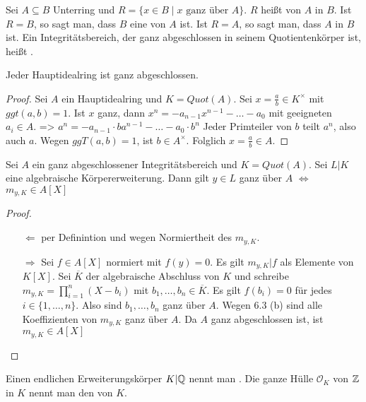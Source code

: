 \documentclass[../main.tex]{subfiles}
\begin{document}
\begin{definition}
    Sei $A\subseteq B$ Unterring und $R=\{x\in B\mid \text{$x$ ganz über $A$}\}$.
    $R$ heißt  von $A$ in $B$.
    Ist $R=B$, so sagt man, dass $B$ eine  von $A$ ist.
    Ist $R=A$, so sagt man, dass $A$  in $B$ ist.
    Ein Integritätsbereich, der ganz abgeschlossen in seinem Quotientenkörper ist, heißt .
\end{definition}
\begin{lemma}
    Jeder Hauptidealring ist ganz abgeschlossen.
\end{lemma}
\begin{proof}
    Sei $A$ ein Hauptidealring und $K=Quot(A)$.
    Sei $x=\frac{a}{b}\in K^\times$ mit $ggt(a,b) = 1$. Ist $x$ ganz, dann $x^n = -a_{n-1}x^{n-1}-\dots -a_0$ mit geeigneten $a_i\in A$.
    => $a^n = -a_{n-1} \cdot ba^{n-1}-\dots - a_0 \cdot b^n$
    Jeder Primteiler von $b$ teilt $a^n$, also auch $a$. Wegen $ggT(a,b)=1$, ist $b\in A^\times$. Folglich $x=\frac{a}{b}\in A$.
\end{proof}
\begin{theorem}
    Sei $A$ ein ganz abgeschlossener Integritätsbereich und $K=Quot(A)$. Sei $L|K$ eine algebraische Körpererweiterung.
    Dann gilt $y\in L$ ganz über $A$ $\Leftrightarrow$ $m_{y,K}\in A[X]$
\end{theorem}
\begin{proof}$ $
    \begin{itemize}
        \item[$\Leftarrow$] per Definintion und wegen Normiertheit des $m_{y,K}$.
        \item[$\Rightarrow$] Sei $f\in A[X]$ normiert mit $f(y) = 0$.
        Es gilt $m_{y,K}|f$ als Elemente von $K[X]$.
        Sei $\overline{K}$ der algebraische Abschluss von $K$ und schreibe $m_{y,K}=\prod_{i=1}^n (X-b_i)$ mit $b_1,\dots,b_n\in \overline{K}$.
        Es gilt $f(b_i)=0$ für jedes $i\in\{1,\dots,n\}$.
        Also sind $b_1,\dots,b_n$ ganz über $A$.
        Wegen 6.3 (b) sind alle Koeffizienten von $m_{y,K}$ ganz über $A$.
        Da $A$ ganz abgeschlossen ist, ist $m_{y,K}\in A[X]$
    \end{itemize}
\end{proof}
\begin{definition}
    Einen endlichen Erweiterungskörper $K|\mathbb{Q}$ nennt man .
    Die ganze Hülle $\mathcal{O}_K$ von $\mathbb{Z}$ in $K$ nennt man den  von $K$.
\end{definition}
\end{document}
